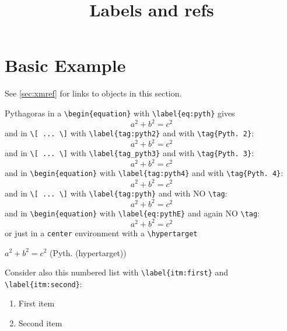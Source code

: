 \documentclass[landscape]{ximera}
\title{Labels and refs}
\begin{document}
\begin{abstract}
\end{abstract}
\maketitle
\label{xim:labels}



\section{Basic Example}
\label{sec:basic example}
See \autoref{sec:xmref} for links to objects in this section.


Pythagoras in a \verb|\begin{equation}| with \verb|\label{eq:pyth}| gives
\begin{equation}
  a^2 + b^2 = c^2   \label{eq:pyth}
\end{equation}
and in \verb|\[ ... \]| with \verb|\label{tag:pyth2}| and with \verb|\tag{Pyth. 2}|:
\[
  a^2 + b^2 = c^2   \label{tag:pyth2} \tag{Pyth. 2}
\]
and in \verb|\[ ... \]| with \verb|\label{tag_pyth3}| and with \verb|\tag{Pyth. 3}|:
\[
  a^2 + b^2 = c^2   \label{tag_pyth3} \tag{Pyth. 3} 
\]
and in \verb|\begin{equation}| with \verb|\label{tag:pyth4}| and with \verb|\tag{Pyth. 4}|:
\begin{equation}
  a^2 + b^2 = c^2   \label{tag:pyth4} \tag{Pyth. 4} 
\end{equation}
and in \verb|\[ ... \]| with \verb|\label{tag:pyth}| and with NO \verb|\tag|:
\[
  a^2 + b^2 = c^2  \label{tag:pyth}
\]
and in \verb|\begin{equation}| with \verb|\label{eq:pythE}| and again NO \verb|\tag|:
\begin{equation}
  a^2 + b^2 = c^2  \label{eq:pythE} 
\end{equation}
or just in a \verb|center| environment with a \verb|\hypertarget|
\begin{center}
 \hfill\qquad $a^2 + b^2 = c^2$  \qquad \hfill  \hypertarget{ht:pyth}{(Pyth. (hypertarget))}
\end{center}

Consider also this numbered list with \verb|\label{itm:first}| and \verb|\label{itm:second}|:
\begin{enumerate}
  \item First item \label{itm:first}
  \item Second item \label{itm:second}
\end{enumerate}
\end{document}
